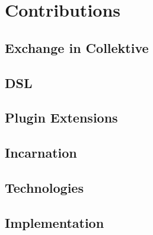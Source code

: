 
\chapter{Contributions}
\label{ch:contributions}

\section{Exchange in Collektive}
\label{sec:exchange-in-collektive}


\section{DSL}
\label{sec:dsl}


\section{Plugin Extensions}
\label{sec:plugin-extensions}


\section{Incarnation}
\label{sec:incarnation}


\section{Technologies}
\label{sec:technologies}


\section{Implementation}
\label{sec:implementation}


%
%


